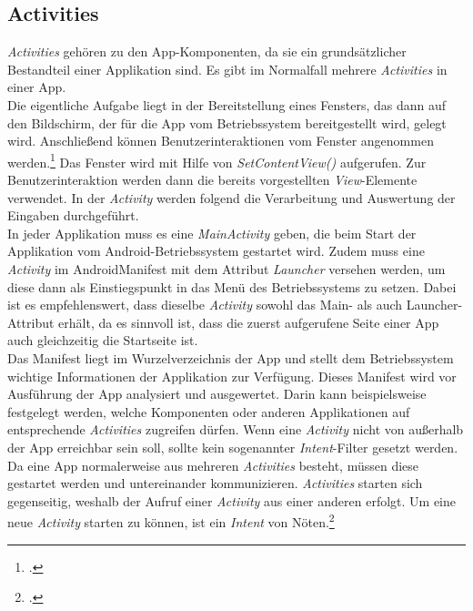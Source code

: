 \subsection{Activities}
\label{ssec:android-activities}
\textit{Activities} gehören zu den App-Komponenten, da sie ein grundsätzlicher Bestandteil einer Applikation sind. Es gibt im Normalfall mehrere \textit{Activities} in einer App.\\
Die eigentliche Aufgabe liegt in der Bereitstellung eines Fensters, das dann auf den Bildschirm, der für die App vom Betriebssystem bereitgestellt wird, gelegt wird. Anschließend können Benutzerinteraktionen vom Fenster angenommen werden.\footcite[S. 40]{Android-BeckerPant} Das Fenster wird mit Hilfe von \textit{SetContentView()} aufgerufen. Zur Benutzerinteraktion werden dann die bereits vorgestellten \textit{View}-Elemente verwendet. In der \textit{Activity} werden folgend die Verarbeitung und Auswertung der Eingaben durchgeführt.\\
In jeder Applikation muss es eine \textit{MainActivity} geben, die beim Start der Applikation vom Android-Betriebssystem gestartet wird. Zudem muss eine \textit{Activity} im AndroidManifest mit dem Attribut \textit{Launcher} versehen werden, um diese dann als Einstiegspunkt in das Menü des Betriebssystems zu setzen. Dabei ist es empfehlenswert, dass dieselbe \textit{Activity} sowohl das Main- als auch Launcher-Attribut erhält, da es sinnvoll ist, dass die zuerst aufgerufene Seite einer App auch gleichzeitig die Startseite ist.\\
Das Manifest liegt im Wurzelverzeichnis der App und stellt dem Betriebssystem wichtige Informationen der Applikation zur Verfügung. Dieses Manifest wird vor Ausführung der App analysiert und ausgewertet. Darin kann beispielsweise festgelegt werden, welche Komponenten oder anderen Applikationen auf entsprechende \textit{Activities} zugreifen dürfen. Wenn eine \textit{Activity} nicht von außerhalb der App erreichbar sein soll, sollte kein sogenannter \textit{Intent}-Filter gesetzt werden.\\
Da eine App normalerweise aus mehreren \textit{Activities} besteht, müssen diese \linebreak gestartet werden und untereinander kommunizieren. \textit{Activities} starten sich gegenseitig, weshalb der Aufruf einer \textit{Activity} aus einer anderen erfolgt. Um eine neue \textit{Activity} starten zu können, ist ein \textit{Intent} von Nöten.\footcite[S. 135ff.]{Android-BeckerPant}
